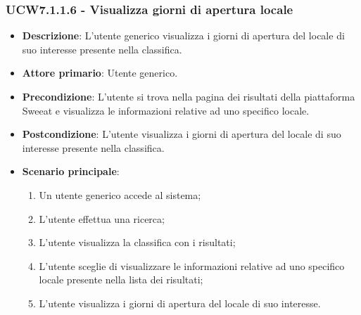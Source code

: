 \subsubsection{UCW7.1.1.6 - Visualizza giorni di apertura locale}
\begin{itemize}
	\item \textbf{Descrizione}: L'utente generico visualizza i giorni di apertura del locale di suo interesse presente nella classifica.
    \item \textbf{Attore primario}: Utente generico.
    \item \textbf{Precondizione}: L’utente si trova nella pagina dei risultati della piattaforma Sweeat e visualizza le informazioni relative ad uno specifico locale.
    \item \textbf{Postcondizione}: L’utente visualizza i giorni di apertura del locale di suo interesse presente nella classifica.
    \item \textbf{Scenario principale}: 
    \begin{enumerate}
        \item Un utente generico accede al sistema;
        \item L’utente effettua una ricerca;
        \item L'utente visualizza la classifica con i risultati;
        \item L'utente sceglie di visualizzare le informazioni relative ad uno specifico locale presente nella lista dei risultati;
        \item L'utente visualizza i giorni di apertura del locale di suo interesse.
    \end{enumerate}
\end{itemize}

